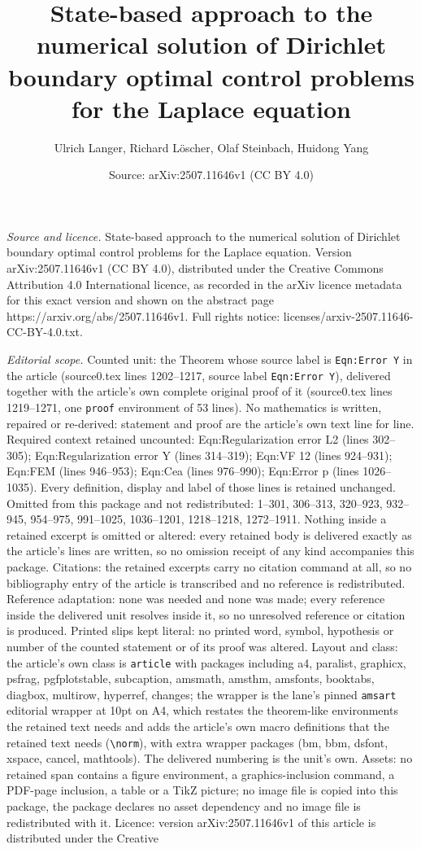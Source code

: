 \documentclass[10pt,a4paper]{amsart}
\title[State-based approach to the numerical solution of Dirichlet ]{State-based approach to the numerical solution of Dirichlet boundary optimal control problems for the Laplace equation}
\author{Ulrich Langer, Richard L\"oscher, Olaf Steinbach, Huidong Yang}
\date{Source: arXiv:2507.11646v1 (CC BY 4.0)}
\begin{document}
\maketitle

\noindent\emph{Source and licence.} State-based approach to the numerical solution of Dirichlet boundary optimal control problems for the Laplace equation. Version arXiv:2507.11646v1 (CC BY 4.0), distributed under the Creative Commons Attribution 4.0 International licence, as recorded in the arXiv licence metadata for this exact version and shown on the abstract page https://arxiv.org/abs/2507.11646v1. Full rights notice: licenses/arxiv-2507.11646-CC-BY-4.0.txt.\par\smallskip

\noindent\textit{Editorial scope.} Counted unit: the Theorem whose source label is \texttt{Eqn:Error Y} in the article (source0.tex lines 1202--1217, source label \texttt{Eqn:Error Y}), delivered together with the article's own complete original proof of it (source0.tex lines 1219--1271, one \texttt{proof} environment of 53 lines). No mathematics is written, repaired or re-derived: statement and proof are the article's own text line for line. Required context retained uncounted: Eqn:Regularization error L2 (lines 302--305); Eqn:Regularization error Y (lines 314--319); Eqn:VF 12 (lines 924--931); Eqn:FEM (lines 946--953); Eqn:Cea (lines 976--990); Eqn:Error p (lines 1026--1035). Every definition, display and label of those lines is retained unchanged. Omitted from this package and not redistributed: 1--301, 306--313, 320--923, 932--945, 954--975, 991--1025, 1036--1201, 1218--1218, 1272--1911. Nothing inside a retained excerpt is omitted or altered: every retained body is delivered exactly as the article's lines are written, so no omission receipt of any kind accompanies this package. Citations: the retained excerpts carry no citation command at all, so no bibliography entry of the article is transcribed and no reference is redistributed. Reference adaptation: none was needed and none was made; every reference inside the delivered unit resolves inside it, so no unresolved reference or citation is produced. Printed slips kept literal: no printed word, symbol, hypothesis or number of the counted statement or of its proof was altered. Layout and class: the article's own class is \texttt{article} with packages including a4, paralist, graphicx, psfrag, pgfplotstable, subcaption, amsmath, amsthm, amsfonts, booktabs, diagbox, multirow, hyperref, changes; the wrapper is the lane's pinned \texttt{amsart} editorial wrapper at 10pt on A4, which restates the theorem-like environments the retained text needs and adds the article's own macro definitions that the retained text needs (\texttt{\textbackslash norm}), with extra wrapper packages (bm, bbm, dsfont, xspace, cancel, mathtools). The delivered numbering is the unit's own. Assets: no retained span contains a figure environment, a graphics-inclusion command, a PDF-page inclusion, a table or a TikZ picture; no image file is copied into this package, the package declares no asset dependency and no image file is redistributed with it. Licence: version arXiv:2507.11646v1 of this article is distributed under the Creative 
\end{document}
